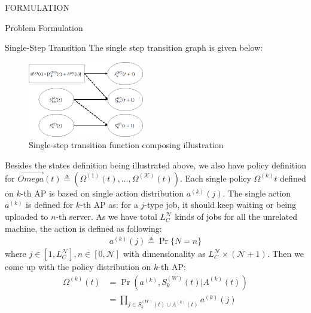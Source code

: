 \documentclass[10pt, conference, letterpaper]{IEEEtran}
\begin{document}
\begin{section}{FORMULATION}
\begin{subsection}{Problem Formulation}
\begin{subsubsection}{Single-Step Transition}
                The single step transition graph is given below:
                \begin{figure}[h]
                    \centering
                    \includegraphics[width=0.45\textwidth]{single-transition.png}
                    \caption{Single-step transition function composing illustration}
                    \label{fig:trans}
                \end{figure}
                Besides the states definition being illustrated above, we also have policy definition for $\vec{Omega}(t) \triangleq (\Omega^{(1)}(t), \dots, \Omega^{(\mathcal{K})}(t))$. Each single policy $\Omega^{(k)}{t}$ defined on $k$-th AP is based on single action distribution $a^{(k)}(j)$.
                The single action $a^{(k)}$ is defined for $k$-th AP as: for a $j$-type job, it should keep waiting or being uploaded to $n$-th server. As we have total $L_C^{\mathcal{N}}$ kinds of jobs for all the unrelated machine, the action is defined as following:
                \begin{align}
                    a^{(k)}(j) \triangleq \Pr\{N=n\}
                \end{align}
                where $j \in [1, L_C^{\mathcal{N}}], n \in [0,\mathcal{N}]$ with dimensionality as $L_C^{\mathcal{N}} \times (\mathcal{N}+1)$. Then we come up with the policy distribution on $k$-th AP:
                \begin{align}
                    \Omega^{(k)}(t) &= \Pr(a^{(k)}, S^{(W)}_k(t)|A^{(k)}(t))
                    \nonumber\\
                    &= \prod_{j \in S^{(W)}_k(t) \cup A^{(k)}(t)} a^{(k)}(j)
                \end{align}


\end{subsubsection}
\end{subsection}
\end{section}
\end{document}
